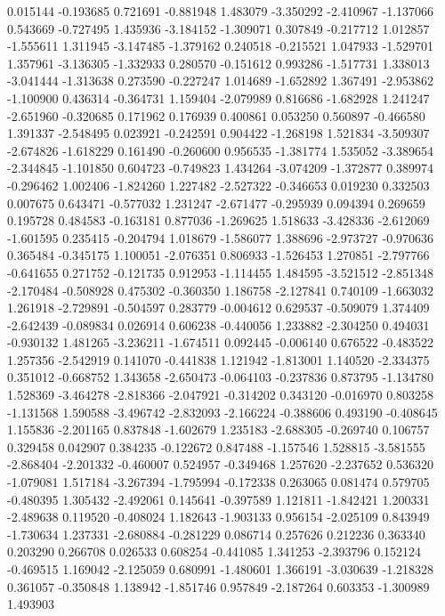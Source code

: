 0.015144
-0.193685
0.721691
-0.881948
1.483079
-3.350292
-2.410967
-1.137066
0.543669
-0.727495
1.435936
-3.184152
-1.309071
0.307849
-0.217712
1.012857
-1.555611
1.311945
-3.147485
-1.379162
0.240518
-0.215521
1.047933
-1.529701
1.357961
-3.136305
-1.332933
0.280570
-0.151612
0.993286
-1.517731
1.338013
-3.041444
-1.313638
0.273590
-0.227247
1.014689
-1.652892
1.367491
-2.953862
-1.100900
0.436314
-0.364731
1.159404
-2.079989
0.816686
-1.682928
1.241247
-2.651960
-0.320685
0.171962
0.176939
0.400861
0.053250
0.560897
-0.466580
1.391337
-2.548495
0.023921
-0.242591
0.904422
-1.268198
1.521834
-3.509307
-2.674826
-1.618229
0.161490
-0.260600
0.956535
-1.381774
1.535052
-3.389654
-2.344845
-1.101850
0.604723
-0.749823
1.434264
-3.074209
-1.372877
0.389974
-0.296462
1.002406
-1.824260
1.227482
-2.527322
-0.346653
0.019230
0.332503
0.007675
0.643471
-0.577032
1.231247
-2.671477
-0.295939
0.094394
0.269659
0.195728
0.484583
-0.163181
0.877036
-1.269625
1.518633
-3.428336
-2.612069
-1.601595
0.235415
-0.204794
1.018679
-1.586077
1.388696
-2.973727
-0.970636
0.365484
-0.345175
1.100051
-2.076351
0.806933
-1.526453
1.270851
-2.797766
-0.641655
0.271752
-0.121735
0.912953
-1.114455
1.484595
-3.521512
-2.851348
-2.170484
-0.508928
0.475302
-0.360350
1.186758
-2.127841
0.740109
-1.663032
1.261918
-2.729891
-0.504597
0.283779
-0.004612
0.629537
-0.509079
1.374409
-2.642439
-0.089834
0.026914
0.606238
-0.440056
1.233882
-2.304250
0.494031
-0.930132
1.481265
-3.236211
-1.674511
0.092445
-0.006140
0.676522
-0.483522
1.257356
-2.542919
0.141070
-0.441838
1.121942
-1.813001
1.140520
-2.334375
0.351012
-0.668752
1.343658
-2.650473
-0.064103
-0.237836
0.873795
-1.134780
1.528369
-3.464278
-2.818366
-2.047921
-0.314202
0.343120
-0.016970
0.803258
-1.131568
1.590588
-3.496742
-2.832093
-2.166224
-0.388606
0.493190
-0.408645
1.155836
-2.201165
0.837848
-1.602679
1.235183
-2.688305
-0.269740
0.106757
0.329458
0.042907
0.384235
-0.122672
0.847488
-1.157546
1.528815
-3.581555
-2.868404
-2.201332
-0.460007
0.524957
-0.349468
1.257620
-2.237652
0.536320
-1.079081
1.517184
-3.267394
-1.795994
-0.172338
0.263065
0.081474
0.579705
-0.480395
1.305432
-2.492061
0.145641
-0.397589
1.121811
-1.842421
1.200331
-2.489638
0.119520
-0.408024
1.182643
-1.903133
0.956154
-2.025109
0.843949
-1.730634
1.237331
-2.680884
-0.281229
0.086714
0.257626
0.212236
0.363340
0.203290
0.266708
0.026533
0.608254
-0.441085
1.341253
-2.393796
0.152124
-0.469515
1.169042
-2.125059
0.680991
-1.480601
1.366191
-3.030639
-1.218328
0.361057
-0.350848
1.138942
-1.851746
0.957849
-2.187264
0.603353
-1.300989
1.493903
